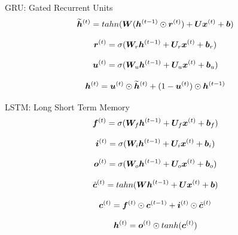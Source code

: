 \documentclass[10pt]{beamer}
\begin{document}
\begin{frame}{GRU: Gated Recurrent Units}
\begin{equation}
\bm{\widetilde{h}}^{(t)} = tahn(\bm{W} (\bm{h}^{(t-1)} \odot  \bm{r}^{(t)}) + \bm{U} \bm{x}^{(t)} + \bm{b})
\end{equation}

\begin{equation}
\bm{r}^{(t)} = \sigma(\bm{W}_{r} \bm{h}^{(t-1)} + \bm{U}_{r} \bm{x}^{(t)} + \bm{b}_{r})
\end{equation}


\begin{equation}
\bm{u}^{(t)} = \sigma(\bm{W}_{u} \bm{h}^{(t-1)} + \bm{U}_{u} \bm{x}^{(t)} + \bm{b}_{u})
\end{equation}

\begin{equation}
\bm{h}^{(t)} = \bm{u}^{(t)} \odot \bm{\widetilde{h}}^{(t)} + (1 - \bm{u}^{(t)}) \odot \bm{h}^{(t-1)} 
\end{equation}

\end{frame}

\begin{frame}{LSTM: Long Short Term Memory}
\begin{equation}
\bm{f}^{(t)} = \sigma(\bm{W}_{f} \bm{h}^{(t-1)} + \bm{U}_{f} \bm{x}^{(t)} + \bm{b}_{f})
\end{equation}

\begin{equation}
\bm{i}^{(t)} = \sigma(\bm{W}_{i} \bm{h}^{(t-1)} + \bm{U}_{i} \bm{x}^{(t)} + \bm{b}_{i})
\end{equation}

\begin{equation}
\bm{o}^{(t)} = \sigma(\bm{W}_{o} \bm{h}^{(t-1)} + \bm{U}_{o} \bm{x}^{(t)} + \bm{b}_{o})
\end{equation}


\begin{equation}
\tilde{\bm{c}}^{(t)} = tahn(\bm{W} \bm{h}^{(t-1)} + \bm{U} \bm{x}^{(t)} + \bm{b})
\end{equation}

\begin{equation}
\bm{c}^{(t)} = \bm{f}^{(t)} \odot \bm{c}^{(t-1)} + \bm{i}^{(t)} \odot \tilde{\bm{c}}^{(t)}
\end{equation}

\begin{equation}
\bm{h}^{(t)} = \bm{o}^{(t)} \odot tanh(\bm{c}^{(t)})
\end{equation}

\end{frame}
\end{document}
